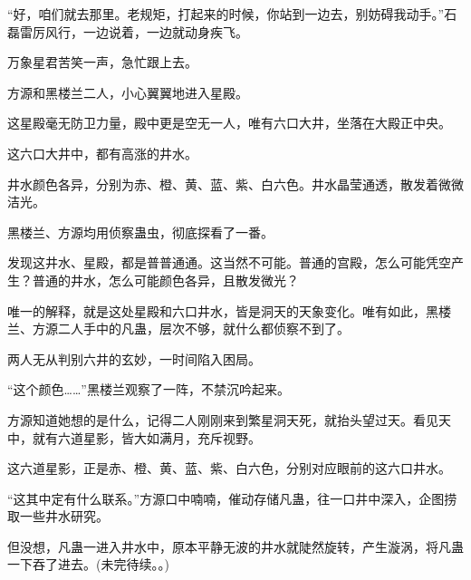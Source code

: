 \begin{this_body}
“好，咱们就去那里。老规矩，打起来的时候，你站到一边去，别妨碍我动手。”石磊雷厉风行，一边说着，一边就动身疾飞。

万象星君苦笑一声，急忙跟上去。

方源和黑楼兰二人，小心翼翼地进入星殿。

这星殿毫无防卫力量，殿中更是空无一人，唯有六口大井，坐落在大殿正中央。

这六口大井中，都有高涨的井水。

井水颜色各异，分别为赤、橙、黄、蓝、紫、白六色。井水晶莹通透，散发着微微洁光。

黑楼兰、方源均用侦察蛊虫，彻底探看了一番。

发现这井水、星殿，都是普普通通。这当然不可能。普通的宫殿，怎么可能凭空产生？普通的井水，怎么可能颜色各异，且散发微光？

唯一的解释，就是这处星殿和六口井水，皆是洞天的天象变化。唯有如此，黑楼兰、方源二人手中的凡蛊，层次不够，就什么都侦察不到了。

两人无从判别六井的玄妙，一时间陷入困局。

“这个颜色……”黑楼兰观察了一阵，不禁沉吟起来。

方源知道她想的是什么，记得二人刚刚来到繁星洞天死，就抬头望过天。看见天中，就有六道星影，皆大如满月，充斥视野。

这六道星影，正是赤、橙、黄、蓝、紫、白六色，分别对应眼前的这六口井水。

“这其中定有什么联系。”方源口中喃喃，催动存储凡蛊，往一口井中深入，企图捞取一些井水研究。

但没想，凡蛊一进入井水中，原本平静无波的井水就陡然旋转，产生漩涡，将凡蛊一下吞了进去。(未完待续。。)

\end{this_body}

